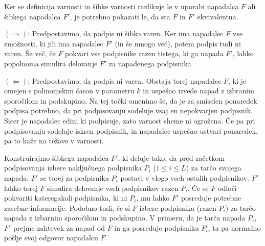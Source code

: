 \documentclass[isrm2, tisk]{fmfdelo}
\begin{document}
\begin{dokaz}
    Ker se definicija varnosti in šibke varnosti razlikuje le v uporabi napadalca $F$ ali šibkega
    napadalca $F'$, je potrebno pokazati le, da sta $F$ in $F'$ ekvivalentna.

    $(\Rightarrow)$: Predpostavimo, da podpis ni šibko varen. Ker ima napadalec $F$ vse zmožnosti,
    ki jih ima napadalec $F'$ (in še mnogo več), potem podpis tudi ni varen. Še več, če $F$ pokvari
    vse podpisnike razen tistega, ki ga napada $F'$, lahko popolnoma simulira delovanje $F'$ za
    napadenega podpisnika.

    $(\Leftarrow)$: Predpostavimo, da podpis ni varen. Obstaja torej napadalec $F$, ki je omejen
    s polinomskim čason v parametru $k$ in uspešno izvede napad z izbranim sporočilom in podskupino.
    Na tej točki omenimo še, da je za smiselen ponaredek podpisa potrebno, da pri podpisovanju sodeluje
    vsaj en nepokvarjen podpisnik. Sicer je napadalec edini ki podpisuje, zato varnost sheme ni ogrožena.
    Če pa pri podpisovanju sodeluje iskren podpisnik, in napadalec uspešno ustvari ponaredek, pa
    to kaže na težave v varnosti.
    
    Konstruirajmo šibkega napadalca $F'$, ki deluje tako, da pred začetkom podpisovanja izbere naključnega
    podpisnika $P_i$ ($1 \le i \le L$) za tarčo svojega napada. $F'$ se torej za podpisnika $P_i$ postavi
    v vlogo vseh ostalih podpisnikov. $F'$ lahko torej $F$ simulira delovanje vseh podpisnikov razen
    $P_i$. Če se $F$ odloči pokvariti kateregakoli podpisnika, ki ni $P_i$, mu lahko $F'$ posreduje
    potrebne zasebne informacije. Podobno tudi, če si $F$ izbere podpisnika (razen $P_i$) za tarčo napada z
    izbarnim sporočilom in podskupino. V primeru, da je tarča napada $P_i$, $F'$ prejme zahtevek za
    napad od $F$ in ga posreduje podpisniku $P_i$, ta pa normalno pošlje svoj odgovor napadalcu $F$.


\end{dokaz}
\end{document}
